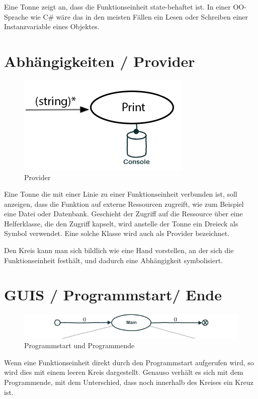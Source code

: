 Eine Tonne zeigt an, dass die Funktionseinheit state-behaftet ist.
In einer OO-Sprache wie C\# wäre das in den meisten Fällen ein Lesen oder
Schreiben einer Instanzvariable eines Objektes.

\section{Abhängigkeiten / Provider}

\begin{figure}[H]
	\centering
		\includegraphics[width=.5\linewidth]{./img/diagramProvider.png}
	\caption{Provider}
\end{figure}



Eine Tonne die mit einer Linie zu einer Funktionseinheit verbunden ist, soll
anzeigen, dass die Funktion auf externe Ressourcen zugreift, wie zum
Beispiel eine Datei oder Datenbank. 
Geschieht der Zugriff auf die Ressource über eine Helferklasse, die den Zugriff
kapselt, wird anstelle der Tonne ein Dreieck als Symbol verwendet. Eine solche
Klasse wird auch als Provider bezeichnet. 

Den Kreis kann man sich bildlich wie eine Hand vorstellen, an der sich die
Funktionseinheit festhält, und dadurch eine Abhängigkeit symbolisiert.

\section{GUIS / Programmstart/ Ende}

\begin{figure}[H]
	\centering
		\includegraphics[width=.9\linewidth]{./img/diagramStartEnd.png}
	\caption{Programmstart und Programmende}
\end{figure}




Wenn eine Funktionseinheit direkt durch den Programmstart aufgerufen wird, so
wird dies mit einem leeren Kreis dargestellt. Genauso verhält es sich mit dem
Programmende, mit dem Unterschied, dass noch innerhalb des Kreises ein Kreuz ist.

